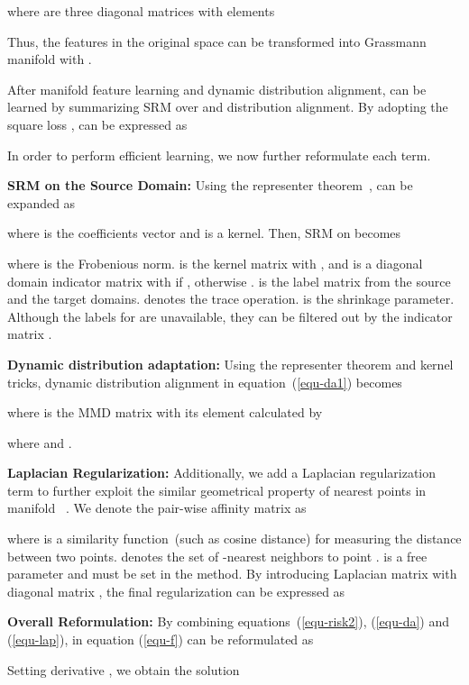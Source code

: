 \documentclass[acmsmall]{acmart}
\begin{document}
where  are three diagonal matrices with elements


Thus, the features in the original space can be transformed into Grassmann manifold with .

After manifold feature learning and dynamic distribution alignment,  can be learned by summarizing SRM over  and distribution alignment. By adopting the square loss ,  can be expressed as


In order to perform efficient learning, we now further reformulate each term.

\textbf{SRM on the Source Domain:} 
Using the representer theorem~\cite{belkin2006manifold},  can be expanded as 

where  is the coefficients vector and  is a kernel. Then, SRM on  becomes

where  is the Frobenious norm.  is the kernel matrix with , and  is a diagonal domain indicator matrix with  if , otherwise .  is the label matrix from the source and the target domains.  denotes the trace operation.  is the shrinkage parameter. Although the labels for  are unavailable, they can be filtered out by the indicator matrix .

\textbf{Dynamic distribution adaptation: }
Using the representer theorem and kernel tricks, dynamic distribution alignment in equation~(\ref{equ-da1}) becomes

where  is the MMD matrix with its element calculated by


where  and .

\textbf{Laplacian Regularization: } 
Additionally, we add a Laplacian regularization term to further exploit the similar geometrical property of nearest points in manifold ~\cite{belkin2006manifold}. We denote the pair-wise affinity matrix as

where  is a similarity function~(such as cosine distance) for measuring the distance between two points.  denotes the set of -nearest neighbors to point .  is a free parameter and must be set in the method. By introducing Laplacian matrix  with diagonal matrix , the final regularization can be expressed as


\textbf{Overall Reformulation:} By combining equations~(\ref{equ-risk2}), (\ref{equ-da}) and (\ref{equ-lap}),  in equation (\ref{equ-f}) can be reformulated as


Setting derivative , we obtain the solution 
\end{document}
